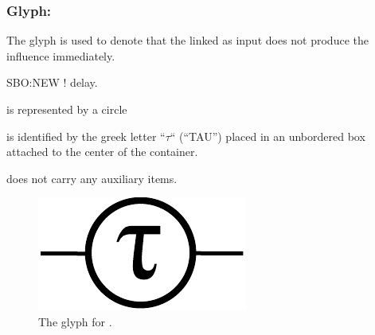 \color{red}
\subsubsection{Glyph: }\label{sec:delay}

The glyph  is used to denote that the  linked as input does not produce the influence immediately.

\begin{glyphDescription}

 \glyphSboTerm SBO:NEW ! delay.

 \glyphContainer {} is represented by a circle

  \glyphLabel {} is identified by the greek letter ``$\tau$`` (``TAU'') placed in an unbordered box attached to the center of the container. 

  \glyphAux {} does not carry any auxiliary items.

\end{glyphDescription}

\begin{figure}[H]
  \centering
  \includegraphics[scale = 0.5]{images/delay}
  \caption{The \ER glyph for .}
  \label{fig:delay}
\end{figure}

